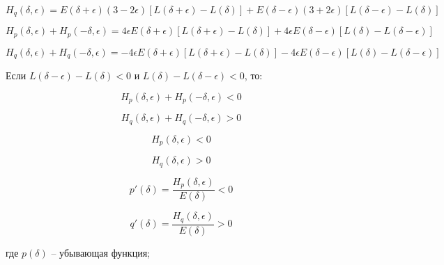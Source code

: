 \begin{equation}
	\label{eq:equation86}
	H_{q}(\delta, \epsilon) = E(\delta + \epsilon)(3 - 2 \epsilon) [L (\delta + \epsilon) - L(\delta)] + E(\delta - \epsilon)(3 + 2\epsilon)[L(\delta - \epsilon) - L(\delta)]
\end{equation}

\begin{equation}
	\label{eq:equation87}
	H_{p}(\delta, \epsilon) + H_{p}(- \delta, \epsilon) = 4 \epsilon E (\delta + \epsilon) [L(\delta + \epsilon) - L(\delta)] + 4 \epsilon E (\delta - \epsilon)[L(\delta) - L (\delta - \epsilon)] 
\end{equation}

\begin{equation}
	\label{eq:equation88}
	H_{q}(\delta, \epsilon) + H_{q}(- \delta, \epsilon) = - 4 \epsilon E (\delta + \epsilon) [L(\delta + \epsilon) - L(\delta)] - 4 \epsilon E (\delta - \epsilon)[L(\delta) - L (\delta - \epsilon)]  
\end{equation}

Если $L (\delta - \epsilon) - L(\delta) < 0$ и $L(\delta) - L(\delta - \epsilon) < 0$, то:

\begin{equation}
	\label{eq:equation89}
	H_{p}(\delta, \epsilon) + H_{p}(- \delta, \epsilon) < 0  
\end{equation}

\begin{equation}
	\label{eq:equation90}
	H_{q}(\delta, \epsilon) + H_{q}(- \delta, \epsilon) > 0  
\end{equation}

\begin{equation}
	\label{eq:equation91}
	H_{p}(\delta, \epsilon) < 0
\end{equation}

\begin{equation}
	\label{eq:equation92}
	H_{q}(\delta, \epsilon) > 0
\end{equation}

\begin{equation}
	\label{eq:equation93}
	p'(\delta) = \frac{H_{p}(\delta, \epsilon)}{E(\delta)} < 0
\end{equation}

\begin{equation}
	\label{eq:equation94}
	q'(\delta) = \frac{H_{q}(\delta, \epsilon)}{E(\delta)} > 0
\end{equation}

где $p(\delta)$ -- убывающая функция;

